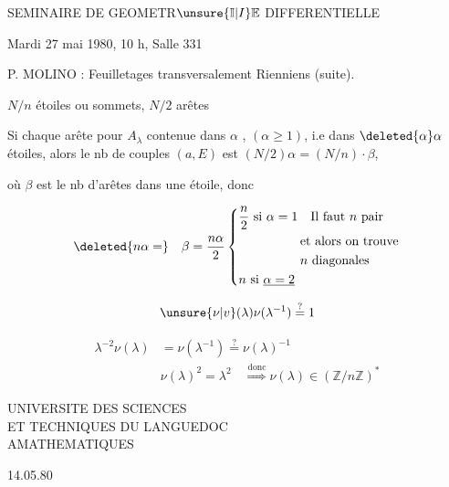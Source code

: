 SEMINAIRE DE GEOMETR$\unsure{\mathbb I|I}\mathbb E$ DIFFERENTIELLE

Mardi 27 mai 1980, 10 h, Salle 331

P. MOLINO : Feuilletages transversalement Rienniens (suite).


$N/n$ étoiles ou sommets, $N/2$ arêtes

Si chaque arête pour $A_\lambda$ contenue dans $\alpha$ ,  $(\alpha\geq1)$, i.e dans $\deleted{\alpha}\alpha$ étoiles, alors le nb de couples $(a,E)$ est $(N/2)\alpha=(N/n)\cdot\beta$,

où $\beta$ est le nb d'arêtes dans une étoile, donc

\[
\deleted{n\alpha=}\quad \beta=\frac{n\alpha}{2}\left\{\begin{aligned}
&\frac n2\ \text{si }\alpha=1\quad\text{Il faut }n\text{ pair}\\
&\hspace{1.7cm}\text{et alors on trouve}\\
&\hspace{1.7cm}n\ \text{diagonales}\\
&n\ \text{si }\underline{\alpha=2}
\end{aligned}\right.
\]


\[
\unsure{\nu|v}(\lambda)\nu(\lambda^{-1})\overset{?}{=}1
\]

\[
\begin{aligned}
\lambda^{-2}\nu(\lambda)&=\nu(\lambda^{-1})\overset{?}{=}\nu(\lambda)^{-1}\\
&\nu(\lambda)^2=\lambda^2\quad\overset{\text{donc}}{\Longrightarrow}\boxed{\nu(\lambda)\in(\mathbb Z/n\mathbb Z)^*}
\end{aligned}
\]


UNIVERSITE DES SCIENCES\\
ET TECHNIQUES DU LANGUEDOC\\
AMATHEMATIQUES

14.05.80

